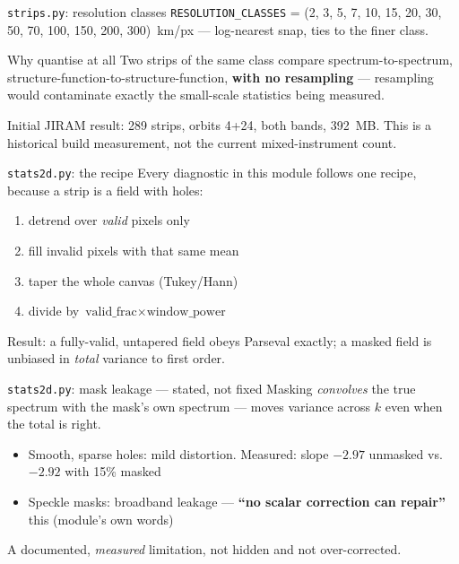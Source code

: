 \documentclass[aspectratio=169,11pt]{beamer}
\newcommand{\currevsec}{}
\newcommand{\revsec}[1]{\gdef\currevsec{#1}}
\begin{document}
\begin{frame}{\texttt{strips.py}: resolution classes}
  \revsec{4.13}
  \texttt{RESOLUTION\_CLASSES} = (2, 3, 5, 7, 10, 15, 20, 30, 50, 70, 100, 150, 200, 300)~km/px --- log-nearest snap, ties to the finer class.
  \vspace{0.2cm}
  \begin{block}{Why quantise at all}
    Two strips of the same class compare spectrum-to-spectrum, structure-function-to-structure-function, \textbf{with no resampling} --- resampling would contaminate exactly the small-scale statistics being measured.
  \end{block}
  Initial JIRAM result: 289 strips, orbits 4+24, both bands, 392~MB. This is a historical build measurement, not the current mixed-instrument count.
\end{frame}

\begin{frame}{\texttt{stats2d.py}: the recipe}
  \revsec{4.14}
  Every diagnostic in this module follows one recipe, because a strip is a field with holes:
  \begin{enumerate}
    \item detrend over \emph{valid} pixels only
    \item fill invalid pixels with that same mean
    \item taper the whole canvas (Tukey/Hann)
    \item divide by $\text{valid\_frac} \times \text{window\_power}$
  \end{enumerate}
  Result: a fully-valid, untapered field obeys Parseval exactly; a masked field is unbiased in \emph{total} variance to first order.
\end{frame}

\begin{frame}{\texttt{stats2d.py}: mask leakage --- stated, not fixed}
  \revsec{4.14}
  Masking \emph{convolves} the true spectrum with the mask's own spectrum --- moves variance across $k$ even when the total is right.
  \begin{itemize}
    \item Smooth, sparse holes: mild distortion. Measured: slope $-2.97$ unmasked vs.\ $-2.92$ with 15\% masked
    \item Speckle masks: broadband leakage --- \textbf{``no scalar correction can repair''} this (module's own words)
  \end{itemize}
  A documented, \emph{measured} limitation, not hidden and not over-corrected.
\end{frame}
\end{document}
